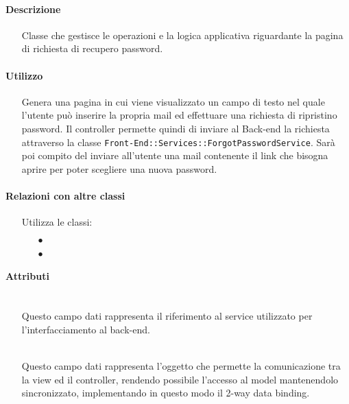 \paragraph*{Descrizione}
\begin{itemize}
\item[] Classe che gestisce le operazioni e la logica applicativa riguardante la pagina di richiesta di recupero password.
\end{itemize}

\paragraph*{Utilizzo}
\begin{itemize}
\item[] Genera una pagina in cui viene visualizzato un campo di testo nel quale l'utente può inserire la propria mail ed effettuare una richiesta di ripristino password. Il controller permette quindi di inviare al Back-end la richiesta attraverso la classe \texttt{Front-End::Services::ForgotPasswordService}. Sarà poi compito del  inviare all'utente una mail contenente il link che bisogna aprire per poter scegliere una nuova password.
\end{itemize}

\paragraph*{Relazioni con altre classi}
\begin{itemize}


\item[] Utilizza le classi:
\begin{itemize}
\item[$\bullet$] 
\item[$\bullet$] 
\end{itemize}
\end{itemize}

\paragraph*{Attributi}
\begin{itemize}
\item[]  \\ Questo campo dati rappresenta il riferimento al service utilizzato per l'interfacciamento al back-end.
\item[]  \\ Questo campo dati rappresenta l'oggetto che permette la comunicazione tra la view ed il controller, rendendo possibile l’accesso al model mantenendolo sincronizzato, implementando in questo modo il 2-way data binding.
\end{itemize}

